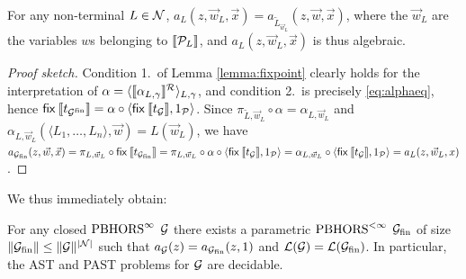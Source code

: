 \begin{proposition}
	\label{theorem:infalgebraic}
For any non-terminal $L\in \mathcal{N}$, $a_L(z,\vec w_L,\vec x)= a_{\tilde{L}_{\vec w_L}}(z,\vec w,\vec x)$, where 
the $\vec w_L$ are the variables $w$s belonging to $\llbracket\mathcal{P}_L\rrbracket$, 
and $a_L(z,\vec w_L,\vec x)$ is thus algebraic.


\end{proposition}
\begin{proof}[Proof sketch]
Condition 1.~of Lemma \ref{lemma:fixpoint} clearly holds for the interpretation of $\alpha=\langle \llbracket\alpha_{L,\gamma}\rrbracket^{\mathcal{R}}\rangle_{L,\gamma}$, and condition 2.~is precisely \eqref{eq:alphaeq}, hence $\mathsf{fix}\: \llbracket t_{\mathcal{G}^{\mathrm{fin}}}\rrbracket= \alpha\circ \langle \mathsf{fix}\:\llbracket t_{\mathcal{G}}\rrbracket,1_{\mathcal{P}}\rangle$.
Since $\pi_{\tilde{L},\vec w_L}\circ \alpha= \alpha_{L,\vec w_L}$ and 
$\alpha_{L,\vec w_L}(\langle L_1,\dots, L_n\rangle,\vec w)= L(\vec w_L)$, we have 
$
a_{\mathcal{G}_{\mathrm{fin}}}(z,\vec w,\vec x)=
\pi_{L,\vec w_L}\circ \mathsf{fix}\: \llbracket t_{\mathcal{G}_{\mathrm{fin}}}\rrbracket=
\pi_{L,\vec w_L}\circ \alpha\circ \langle \mathsf{fix}\:\llbracket t_{\mathcal{G}}\rrbracket,1_{\mathcal{P}}\rangle=
\alpha_{L,\vec w_L}\circ \langle \mathsf{fix}\:\llbracket t_{\mathcal{G}}\rrbracket,1_{\mathcal{P}}\rangle= 
 a_{L}(z,\vec w_L,x)$.
%
%
\end{proof}
%
%
%	
%
We thus immediately obtain:
\begin{corollary}
For any closed $\text{PBHORS}^{\infty}$ $\mathcal{G}$ there exists a parametric $\text{PBHORS}^{<\infty}$ $\mathcal{G}_{\mathrm{fin}}$ of size $\|\mathcal{G}_{\mathrm{fin}}\|\leq \|\mathcal{G}\|^{|\mathcal{N}|}$ such that $a_{\mathcal{G}}(z)=a_{\mathcal{G}_{\mathrm{fin}}}(z,1)$ and $\mathcal{L}(\mathcal{G})=\mathcal{L}(\mathcal{G}_{\mathrm{fin}})$.
In particular, the AST and PAST problems for $\mathcal{G}$ are decidable.
\end{corollary}
